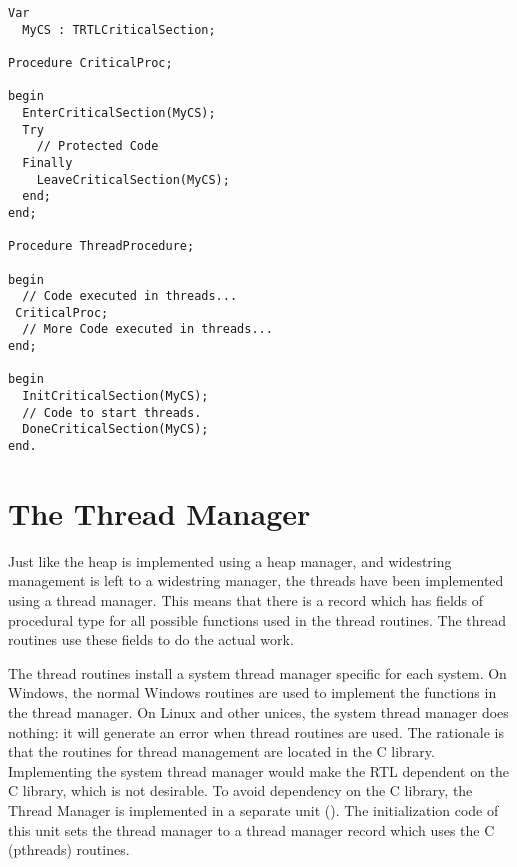 \begin{verbatim}
Var
  MyCS : TRTLCriticalSection;

Procedure CriticalProc;

begin
  EnterCriticalSection(MyCS);
  Try
    // Protected Code
  Finally
    LeaveCriticalSection(MyCS);
  end;
end;

Procedure ThreadProcedure;

begin
  // Code executed in threads...
 CriticalProc;
  // More Code executed in threads...
end;

begin
  InitCriticalSection(MyCS);
  // Code to start threads.
  DoneCriticalSection(MyCS);
end.
\end{verbatim}

\section{The Thread Manager}
Just like the heap is implemented using a heap manager, and widestring
management is left to a widestring manager, the threads have been
implemented using a thread manager. This means that there is a record which
has fields of procedural type for all possible functions used in the thread 
routines. The thread routines use these fields to do the actual work. 

The thread routines install a system thread manager specific for each
system. On Windows, the normal Windows routines are used to implement the
functions in the thread manager. On Linux and other unices, the system
thread manager does nothing: it will generate an error when thread routines
are used. The rationale is that the routines for thread management are
located in the C library. Implementing the system thread manager would make
the RTL dependent on the C library, which is not desirable. To avoid 
dependency on the C library, the Thread Manager is implemented in a separate
unit (). The initialization code of this unit sets the thread
manager to a thread manager record which uses the C (pthreads) routines.

